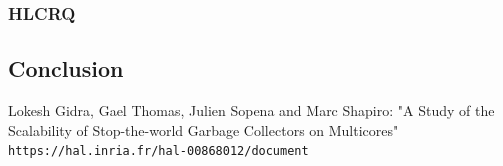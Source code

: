 \documentclass{article}
\begin{document}
 \subsubsection{HLCRQ}

 \subsection{Conclusion}

  \medskip
  \newpage

  \begin{thebibliography}{9}
      Lokesh Gidra, Gael Thomas, Julien Sopena and Marc Shapiro: "A Study of the Scalability of Stop-the-world Garbage Collectors on Multicores"
      \\\texttt{https://hal.inria.fr/hal-00868012/document}
  \end{thebibliography}
\end{document}
